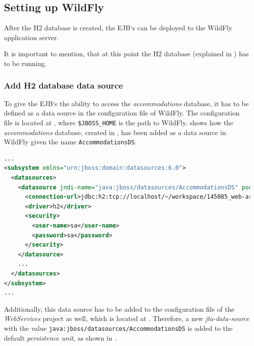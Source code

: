 \subsection{Setting up WildFly}\label{sec:03_depl_wildfly}
After the H2 database is created, the EJB`s can be deployed to the WildFly application server.

It is important to mention, that at this point the H2 database (explained in ) has to be running.

\subsubsection{Add H2 database data source}\label{sec:03_depl_wildfly_datasource}
To give the EJB`s the ability to access the \textit{accommodations} database, it has to be defined as a data source in the configuration file of WildFly. The configuration file is located at , where \texttt{\$JBOSS\_HOME} is the path to WildFly. 
 shows how the \textit{accommodations} database, created in , has been added as a data source in WildFly given the name \texttt{AccommodationsDS}.
\begin{lstlisting}[label=lst:03_depl_wildfly_datasource_config, caption=WildFly datasource configuration, language=xml]
...
<subsystem xmlns="urn:jboss:domain:datasources:6.0">
  <datasources>
    <datasource jndi-name="java:jboss/datasources/AccommodationsDS" pool-name="AccommodationsDS" enabled="true" use-java-context="true" statistics-enabled="${wildfly.datasources.statistics-enabled:${wildfly.statistics-enabled:false}}">
      <connection-url>jdbc:h2:tcp://localhost/~/workspace/145085_web-architectures/assignment_5/accommodations;DB_CLOSE_DELAY=-1;DB_CLOSE_ON_EXIT=FALSE</connection-url>
      <driver>h2</driver>
      <security>
        <user-name>sa</user-name>
        <password>sa</password>
      </security>
    </datasource>
    ...
  </datasources>
</subsystem>
...
\end{lstlisting}

Additionally, this data source has to be added to the  configuration file of the \textit{WebServices} project as well, which is located at .
Therefore, a new \textit{jta-data-source} with the value \texttt{java:jboss/datasources/AccommodationsDS} is added to the default \textit{persistence unit}, as shown in .

